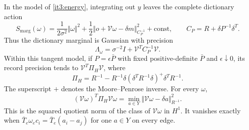 \documentclass[11pt,letterpaper]{report}
\begin{document}
In the model of \cref{it3:energy}, integrating out $y$ leaves the complete dictionary action
\begin{equation}
S_{\mathrm{marg}}(\omega)
=\frac1{2\sigma^2}\Vert\omega\Vert^2
+\frac12\Vert o+\mathcal V\omega-\delta m\Vert_{C_P^{-1}}^2
+\mathrm{const},\qquad
C_P=R+\delta P^{-1}\delta^T.
\label{it3:affine-action}
\end{equation}
Thus the dictionary marginal is Gaussian with precision
\begin{equation}
\Lambda_\omega=\sigma^{-2}I+\mathcal V^TC_P^{-1}\mathcal V.
\label{it3:marginal}
\end{equation}
Within this tangent model, if $P=\epsilon\bar P$ with fixed positive-definite $\bar P$ and $\epsilon\downarrow0$, its record precision tends to $\mathcal V^T\Pi_H\mathcal V$, where
\begin{equation}
\Pi_H=R^{-1}-R^{-1}\delta(\delta^TR^{-1}\delta)^+\delta^TR^{-1}.
\label{it3:projection}
\end{equation}
The superscript $+$ denotes the Moore--Penrose inverse. For every $\omega$,
\begin{equation}
(\mathcal V\omega)^T\Pi_H\mathcal V\omega
=\min_{a\in Y}\Vert\mathcal V\omega-\delta a\Vert_{R^{-1}}^2.
\label{it3:quotient}
\end{equation}
This is the squared quotient norm of the class of $\mathcal V\omega$ in $H^1$. It vanishes exactly when
$\bar T_e\omega_ec_i=\bar T_e(a_i-a_j)$ for one $a\in Y$ on every edge.
\end{document}
